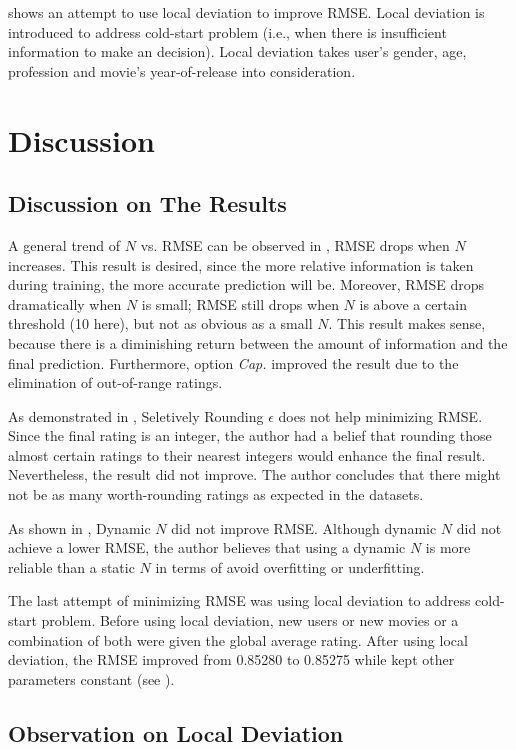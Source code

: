 \documentclass{ece}
\begin{document}
 shows an attempt to use local deviation to improve RMSE.
Local deviation is introduced to address cold-start problem (i.e., when there is insufficient information to make an decision).
Local deviation takes user's gender, age, profession and movie's year-of-release into consideration.

\newpage
\section{Discussion}

\subsection{Discussion on The Results}

A general trend of $N$ vs. RMSE can be observed in , RMSE drops when $N$ increases.
This result is desired, since the more relative information is taken during training, the more accurate prediction will be.
Moreover, RMSE drops dramatically when $N$ is small; RMSE still drops when $N$ is above a certain threshold (10 here), but not as obvious as a small $N$.
This result makes sense, because there is a diminishing return between the amount of information and the final prediction.
Furthermore, option \textit{Cap.} improved the result due to the elimination of out-of-range ratings.

As demonstrated in , Seletively Rounding $\epsilon$ does not help minimizing RMSE.
Since the final rating is an integer, the author had a belief that rounding those almost certain ratings to their nearest integers would enhance the final result.
Nevertheless, the result did not improve.
The author concludes that there might not be as many worth-rounding ratings as expected in the datasets.

As shown in , Dynamic $N$ did not improve RMSE.
Although dynamic $N$ did not achieve a lower RMSE, the author believes that using a dynamic $N$ is more reliable than a static $N$ in terms of avoid overfitting or underfitting.

The last attempt of minimizing RMSE was using local deviation to address cold-start problem.
Before using local deviation, new users or new movies or a combination of both were given the global average rating.
After using local deviation, the RMSE improved from 0.85280 to 0.85275 while kept other parameters constant (see ).

\subsection{Observation on Local Deviation}
\end{document}
